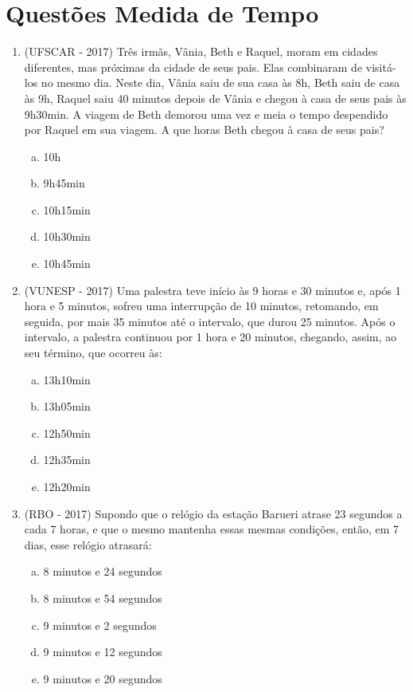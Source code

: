 \section{Questões Medida de Tempo}

\begin{enumerate}[1)]
 \item (UFSCAR - 2017) Três irmãs, Vânia, Beth e Raquel, moram em cidades diferentes, mas próximas da cidade de seus pais. Elas combinaram de visitá-los no mesmo dia. Neste dia, Vânia saiu de sua casa às 8h, Beth saiu de casa às 9h, Raquel saiu 40 minutos depois de Vânia e chegou à casa de seus pais às 9h30min. A viagem de Beth demorou uma vez e meia o tempo despendido por Raquel em sua viagem. A que horas Beth chegou à casa de seus pais?
 \begin{enumerate}[a)]
 \item 10h
 \item 9h45min
 \item 10h15min
 \item 10h30min
 \item 10h45min
 \end{enumerate}

 \item (VUNESP - 2017) Uma palestra teve início às 9 horas e 30 minutos e, após 1 hora e 5 minutos, sofreu uma interrupção de 10 minutos, retomando, em seguida, por mais 35 minutos até o intervalo, que durou 25 minutos. Após o intervalo, a palestra continuou por 1 hora e 20 minutos, chegando, assim, ao seu término, que ocorreu às:
 \begin{enumerate}[a)]
 \item 13h10min
 \item 13h05min
 \item 12h50min
 \item 12h35min
 \item 12h20min
 \end{enumerate}

 \item (RBO - 2017) Supondo que o relógio da estação Barueri atrase 23 segundos a cada 7 horas, e que o mesmo mantenha essas mesmas condições, então, em 7 dias, esse relógio atrasará:
 \begin{enumerate}[a)]
 \item 8 minutos e 24 segundos
 \item 8 minutos e 54 segundos
 \item 9 minutos e 2 segundos
 \item 9 minutos e 12 segundos
 \item 9 minutos e 20 segundos
 \end{enumerate}


\end{enumerate}
